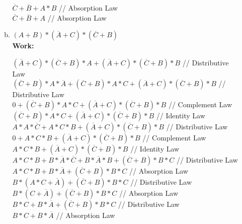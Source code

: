 \documentclass[11pt]{article}
\begin{document}
\begin{enumerate}
\begin{enumerate}[(a)]
\begin{center}
            $\overline{C} + \overline{B} + A * B$ // Absorption Law\\
            $\overline{C} + \overline{B} + A$ // Absorption Law\\
        \end{center}
        \item $(A + B) * (\overline{A} + C) * (\overline{C} + B)$ \\
        \textbf{Work:}
        \begin{center}
            $(\overline{A} + C) * (\overline{C} + B) * A + (\overline{A} + C) * (\overline{C} + B) * B$ // Distributive Law\\
            $(\overline{C} + B) * A * \overline{A} + (\overline{C} + B) * A * C + (\overline{A} + C) * (\overline{C} + B) * B$ // Distributive Law\\
            $0 + (\overline{C} + B) * A * C + (\overline{A} + C) * (\overline{C} + B) * B$ // Complement Law\\
            $(\overline{C} + B) * A * C + (\overline{A} + C) * (\overline{C} + B) * B$ // Identity Law\\
            $A * A * \overline{C} + A * C * B + (\overline{A} + C) * (\overline{C} + B) * B$ // Distributive Law\\
            $0 + A * C * B + (\overline{A} + C) * (\overline{C} + B) * B$ // Complement Law\\
            $A * C * B + (\overline{A} + C) * (\overline{C} + B) * B$ // Identity Law\\
            $A * C * B + B * \overline{A} * \overline{C} + B * \overline{A} * B + (\overline{C} + B) * B * C$ // Distributive Law\\
            $A * C * B + B * \overline{A} + (\overline{C} + B) * B * C$ // Absorption Law\\
            $B * (A * C + \overline{A}) + (\overline{C} + B) * B * C$ // Distributive Law\\
            $B * (C + \overline{A}) + (\overline{C} + B) * B * C$ // Absorption Law\\
            $B * C + B * \overline{A} + (\overline{C} + B) * B * C$ // Distributive Law\\
            $B * C + B * \overline{A}$ // Absorption Law\\
        \end{center}
    \end{enumerate}
    

\end{enumerate}
\end{document}
